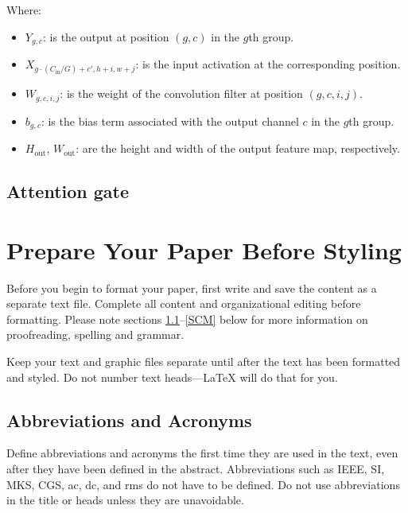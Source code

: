 \documentclass[journal]{IEEEtran} %
\begin{document}
\indent
 Where:
\begin{itemize}
    \item $Y_{g,c}$: is the output at position $(g,c)$ in the $g$th group.
    \item $X_{g \cdot (C_{\text{in}} / G) + c', h+i, w+j}$: is the input activation at the corresponding position.
    \item $W_{g, c, i, j}$: is the weight of the convolution filter at position $(g, c, i, j)$.
    \item $b_{g, c}$: is the bias term associated with the output channel $c$ in the $g$th group.
    \item $H_{\text{out}}$, $W_{\text{out}}$: are the height and width of the output feature map, respectively.
\end{itemize}


\subsection{Attention gate}



\section{Prepare Your Paper Before Styling}
Before you begin to format your paper, first write and save the content as a
separate text file. Complete all content and organizational editing before
formatting. Please note sections \ref{AA}--\ref{SCM} below for more information on
proofreading, spelling and grammar.

Keep your text and graphic files separate until after the text has been
formatted and styled. Do not number text heads---{\LaTeX} will do that
for you.

\subsection{Abbreviations and Acronyms}\label{AA}
Define abbreviations and acronyms the first time they are used in the text,
even after they have been defined in the abstract. Abbreviations such as
IEEE, SI, MKS, CGS, ac, dc, and rms do not have to be defined. Do not use
abbreviations in the title or heads unless they are unavoidable.
\end{document}
